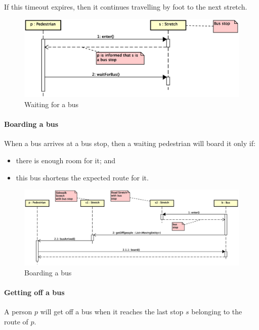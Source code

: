 If this timeout expires, 
then it continues travelling by foot to the next stretch.

\begin{figure}[H]
  \centering
  \includegraphics[width=\columnwidth,trim=1 0 2 0,clip]
    {images/solution/bus_waiting.eps}
  \caption{Waiting for a bus}
  \label{fig:app-inter-wait-bus}
\end{figure}

\paragraph{Boarding a bus} When a bus arrives at a bus stop, then a waiting
pedestrian will board it only if:

\begin{itemize}
  \item there is enough room for it; and
  \item this bus shortens the expected route for it.
\end{itemize}

\begin{figure}[H]
  \centering
  \includegraphics[width=\columnwidth,trim=1 0 0 0,clip]
    {images/solution/bus_boarding.eps}
  \caption{Boarding a bus}
  \label{fig:app-inter-board-bus}
\end{figure}

\paragraph{Getting off a bus} A person $p$ will get off a bus when it reaches
the last stop $s$ belonging to the route of $p$.

